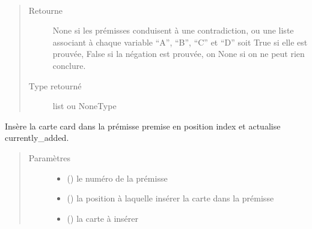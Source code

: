 \documentclass[letterpaper,10pt,french]{sphinxmanual}
\begin{document}
\begin{fulllineitems}
\begin{fulllineitems}
\begin{quote}
\begin{description}
\end{description}\end{quote}

\end{fulllineitems}


\begin{fulllineitems}
\label{\detokenize{doc_classe:cards.Proof.conclusion}}~\begin{quote}\begin{description}
\item[{Retourne}] \leavevmode
None si les prémisses conduisent à une contradiction,
ou une liste associant à chaque variable “A”, “B”, “C” et “D”
soit True si elle est prouvée, False si la négation est
prouvée, on None si on ne peut rien conclure.

\item[{Type retourné}] \leavevmode
list ou NoneType

\end{description}\end{quote}

\end{fulllineitems}


\begin{fulllineitems}
\label{\detokenize{doc_classe:cards.Proof.insert}}
Insère la carte card dans la prémisse premise en position index
et actualise currently\_added.
\begin{quote}\begin{description}
\item[{Paramètres}] \leavevmode\begin{itemize}
\item {} 
 () \textendash{} le numéro de la prémisse

\item {} 
 () \textendash{} la position à laquelle insérer la carte dans la prémisse

\item {} 
 ({\hyperref[\detokenize{doc_classe:cards.Card}]{}}) \textendash{} la carte à insérer


\end{itemize}
\end{description}
\end{quote}
\end{fulllineitems}
\end{fulllineitems}
\end{document}
